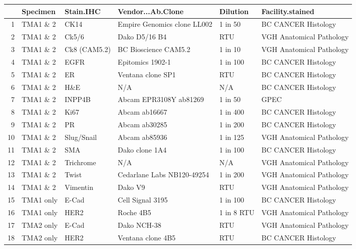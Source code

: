\documentclass{article}
\begin{document}
\begin{table}[ht]
\centering
\begin{tabular}{rlllll}
  \hline
 & Specimen & Stain.IHC & Vendor...Ab.Clone & Dilution & Facility.stained \\ 
  \hline
1 & TMA1 \& 2 & CK14 & Empire Genomics clone LL002 & 1 in 50 & BC CANCER Histology \\ 
  2 & TMA1 \& 2 & Ck5/6 & Dako D5/16 B4 & RTU & VGH Anatomical Pathology \\ 
  3 & TMA1 \& 2 & Ck8 (CAM5.2) & BC Bioscience CAM5.2 & 1 in 10 & VGH Anatomical Pathology \\ 
  4 & TMA1 \& 2 & EGFR & Epitomics 1902-1 & 1 in 100 & BC CANCER Histology \\ 
  5 & TMA1 \& 2 & ER & Ventana  clone SP1 & RTU & BC CANCER Histology \\ 
  6 & TMA1 \& 2 & H\&E & N/A & N/A & BC CANCER Histology \\ 
  7 & TMA1 \& 2 & INPP4B & Abcam EPR3108Y ab81269 & 1 in 50 & GPEC \\ 
  8 & TMA1 \& 2 & Ki67 & Abcam ab16667 & 1 in 400 & BC CANCER Histology \\ 
  9 & TMA1 \& 2 & PR & Abcam ab30285 & 1 in 200 & BC CANCER Histology \\ 
  10 & TMA1 \& 2 & Slug/Snail & Abcam ab85936  & 1 in 125 & VGH Anatomical Pathology \\ 
  11 & TMA1 \& 2 & SMA & Dako clone 1A4 & 1 in 100 & BC CANCER Histology \\ 
  12 & TMA1 \& 2 & Trichrome & N/A & N/A & VGH Anatomical Pathology \\ 
  13 & TMA1 \& 2 & Twist & Cedarlane Labs NB120-49254  & 1 in 200 & VGH Anatomical Pathology \\ 
  14 & TMA1 \& 2 & Vimentin & Dako V9 & RTU & VGH Anatomical Pathology \\ 
  15 & TMA1 only & E-Cad & Cell Signal 3195 & 1 in 100 & BC CANCER Histology \\ 
  16 & TMA1 only & HER2 & Roche 4B5 & 1 in 8 RTU & VGH Anatomical Pathology \\ 
  17 & TMA2 only & E-Cad & Dako NCH-38 & RTU & VGH Anatomical Pathology \\ 
  18 & TMA2 only & HER2 & Ventana  clone 4B5 & RTU & BC CANCER Histology \\ 
   \hline
\end{tabular}
\end{table}
\end{document}
